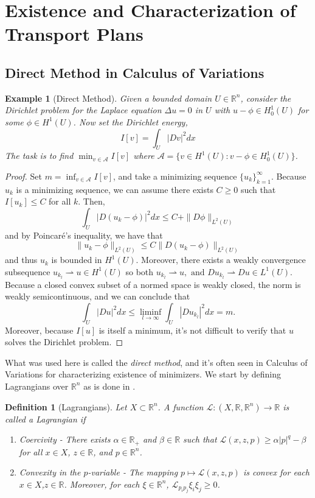 \documentclass[12pt]{article}
\newcommand{\R}{\mathbb{R}}
\theoremstyle{plain}
\newtheorem{defn}{Definition}[section]
\newtheorem{exmp}{Example}[section]
\numberwithin{equation}{section}
\begin{document}
\section{Existence and Characterization of Transport Plans}

\subsection{Direct Method in Calculus of Variations}
\begin{exmp}[Direct Method]
  Given a bounded domain $U\in \R^n$, consider the Dirichlet problem for the Laplace equation $\Delta u = 0$ in $U$ with $u-\phi \in H_0^1(U)$ for some $\phi \in H^1(U)$. Now set the Dirichlet energy,
  \[I[v] = \int_U |Dv|^2dx\]
  The task is to find $\min_{v\in\mathcal{A}} I[v]$ where $\mathcal{A} = \{v\in H^1(U) : v - \phi \in H^1_0(U)\}$.
\end{exmp}
\begin{proof}
  Set $m = \inf_{v\in\mathcal{A}} I[v]$, and take a minimizing sequence $\{u_k\}_{k=1}^\infty$. Because $u_k$ is a minimizing sequence, we can assume there exists $C \ge 0$ such that $I[u_k]\le C$ for all $k$. Then,
  \[\int_U |D(u_k - \phi)|^2 dx \le C + \|D\phi\|_{L^2(U)}\]
  and by Poincar\'e's inequality, we have that 
  \[\|u_k-\phi\|_{L^2(U)} \le C\|D(u_k-\phi)\|_{L^2(U)}\]
  and thus $u_k$ is bounded in $H^1(U)$. Moreover, there exists a weakly convergence subsequence 
  \(u_{k_l}\rightharpoonup u\in H^1(U)\) so both \(u_{k_l}\rightharpoonup u,\text{ and }Du_{k_l}\rightharpoonup Du\in L^1(U)\).\newline
  Because a closed convex subset of a normed space is weakly closed, the norm is weakly semicontinuous, and we can conclude that 
  \[\int_U |Du|^2 dx \le \liminf_{l\to\infty}\int_U |Du_{k_l}|^2dx = m.\]
  Moreover, because $I[u]$ is itself a minimum, it's not difficult to verify that $u$ solves the Dirichlet problem.
\end{proof}
What was used here is called the \textit{direct method}, and it's often seen in Calculus of Variations for characterizing existence of minimizers. We start by defining Lagrangians over $\R^n$ as is done in \cite{evans}.
\begin{defn}[Lagrangians]\label{defn:lagrangian}
  Let $X \subset \R^n$. A function $\mathcal{L} : (X, \R,\R^n) \to \R$ is called a Lagrangian if 
  \begin{enumerate}
    \item Coercivity - There exists $\alpha \in \R_+$ and $\beta\in \R$ such that $\mathcal{L}(x,z,p) \ge \alpha|p|^q - \beta$ for all $x\in X$, $z\in \R$, and $p\in\R^n$.
    \item Convexity in the $p$-variable - The mapping $p\mapsto \mathcal{L}(x,z,p)$ is convex for each $x\in X$,$z\in \R$. Moreover, for each $\xi\in\R^n$, $\mathcal{L}_{p_ip_j}\xi_i\xi_j \ge 0$.
  \end{enumerate}
\end{defn}
\end{document}
